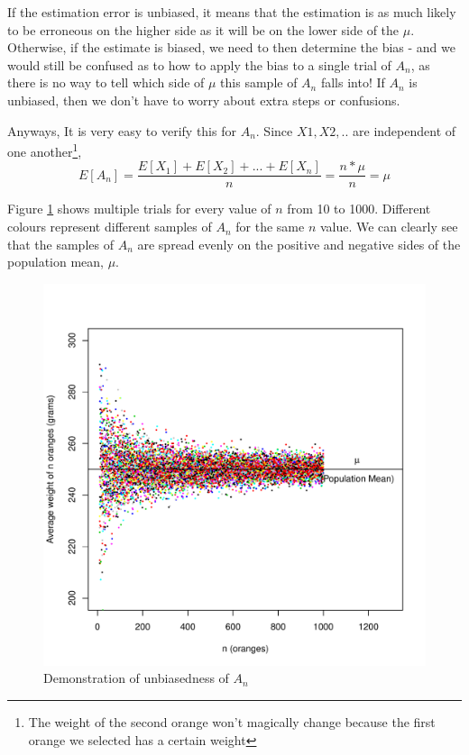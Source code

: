 If the estimation error is unbiased, it means that the estimation is as much likely to be erroneous on the higher side as it will be on the lower side of the $\mu$. Otherwise, if the estimate is biased, we need to then determine the bias - and we would still be confused as to how to apply the bias to a single trial of $A_n$, as there is no way to tell which side of $\mu$ this sample of $A_n$ falls into! If $A_n$ is unbiased, then we don't have to worry about extra steps or confusions. 

Anyways, It is very easy to verify this for $A_n$. Since $X1, X2, ..$ are independent of one another\footnote{The weight of the second orange won't magically change because the first orange we selected has a certain weight}, 
		\[E[A_n] 	= \frac{E[X_1]+E[X_2]+...+E[X_n]}{n}
				= \frac{n*\mu}{n}
				= \mu \]

Figure \ref{fig:multiple_trials} shows multiple trials for every value of $n$ from 10 to 1000. Different colours represent different samples of $A_n$ for the same $n$ value. We can clearly see that the samples of $A_n$ are spread evenly on the positive and negative sides of the population mean, $\mu$.	
\begin{figure}
  \centering
    \includegraphics[width=\textwidth]{Statistics/multiple_trials}
  \caption{Demonstration of unbiasedness of $A_n$}
  \label{fig:multiple_trials}
\end{figure}
				
